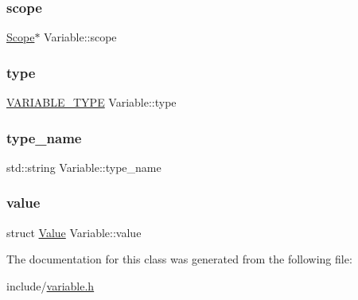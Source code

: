 \mbox{\label{classVariable_a1d7f7a674747e42e4ecc5267252c12d4}} 
\subsubsection{\texorpdfstring{scope}{scope}}
{\footnotesize\ttfamily \hyperlink{classScope}{Scope}$\ast$ Variable\+::scope}

\mbox{\label{classVariable_abd520a8f2c14e6bde4dbabc842094b03}} 
\subsubsection{\texorpdfstring{type}{type}}
{\footnotesize\ttfamily \hyperlink{statics_8h_a4c85b3a98d55cc0252806c950379cce0}{V\+A\+R\+I\+A\+B\+L\+E\+\_\+\+T\+Y\+PE} Variable\+::type}

\mbox{\label{classVariable_ac237e4099c004a617ad8bd2effbfafb2}} 
\subsubsection{\texorpdfstring{type\+\_\+name}{type\_name}}
{\footnotesize\ttfamily std\+::string Variable\+::type\+\_\+name}

\mbox{\label{classVariable_a94151da0f0a411749f84aaf65a9c7045}} 
\subsubsection{\texorpdfstring{value}{value}}
{\footnotesize\ttfamily struct \hyperlink{classValue}{Value} Variable\+::value}



The documentation for this class was generated from the following file\+:\begin{DoxyCompactItemize}
\item 
include/\hyperlink{variable_8h}{variable.\+h}\end{DoxyCompactItemize}
